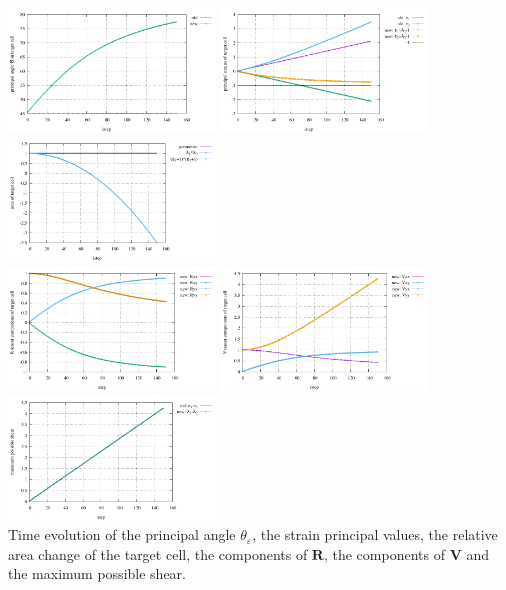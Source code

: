 \begin{center}
\includegraphics[width=5.5cm]{python_codes/fieldstone_89/results/shearband/principal_angle.pdf}
\includegraphics[width=5.5cm]{python_codes/fieldstone_89/results/shearband/principal_strains.pdf}
\includegraphics[width=5.5cm]{python_codes/fieldstone_89/results/shearband/area.pdf}\\
\includegraphics[width=5.5cm]{python_codes/fieldstone_89/results/shearband/R.pdf}
\includegraphics[width=5.5cm]{python_codes/fieldstone_89/results/shearband/V.pdf}
\includegraphics[width=5.5cm]{python_codes/fieldstone_89/results/shearband/maximum_shear.pdf}\\
{\captionfont Time evolution of the principal angle $\theta_\varepsilon$, 
the strain principal values, the relative area change of the target cell, 
the components of ${\bm R}$, the components of ${\bm V}$ and the maximum 
possible shear.}
\end{center}










